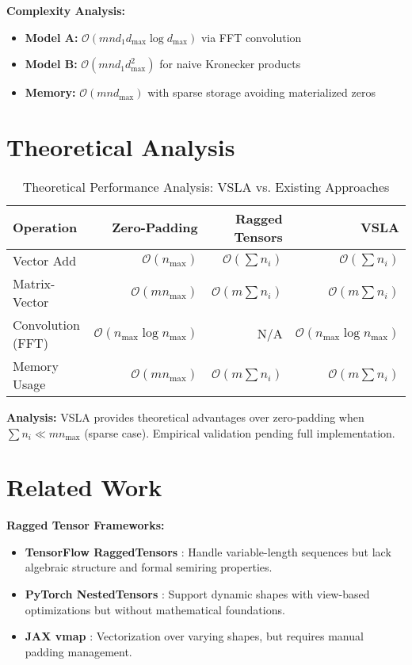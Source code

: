 \documentclass[11pt]{article}
\begin{document}
\textbf{Complexity Analysis:} 
\begin{itemize}[leftmargin=1.5em]
\item \textbf{Model A:} $\mathcal{O}(mn d_1 d_{\max} \log d_{\max})$ via FFT convolution
\item \textbf{Model B:} $\mathcal{O}(mn d_1 d_{\max}^2)$ for naive Kronecker products  
\item \textbf{Memory:} $\mathcal{O}(mn d_{\max})$ with sparse storage avoiding materialized zeros
\end{itemize}

\section{Theoretical Analysis}
\label{sec:evaluation}

\begin{table}[h]
\centering
\caption{Theoretical Performance Analysis: VSLA vs. Existing Approaches}
\begin{tabular}{lrrr}
\toprule
\textbf{Operation} & \textbf{Zero-Padding} & \textbf{Ragged Tensors} & \textbf{VSLA} \\
\midrule
Vector Add & $\mathcal{O}(n_{\max})$ & $\mathcal{O}(\sum n_i)$ & $\mathcal{O}(\sum n_i)$ \\
Matrix-Vector & $\mathcal{O}(mn_{\max})$ & $\mathcal{O}(m\sum n_i)$ & $\mathcal{O}(m\sum n_i)$ \\
Convolution (FFT) & $\mathcal{O}(n_{\max} \log n_{\max})$ & N/A & $\mathcal{O}(n_{\max} \log n_{\max})$ \\
Memory Usage & $\mathcal{O}(mn_{\max})$ & $\mathcal{O}(m\sum n_i)$ & $\mathcal{O}(m\sum n_i)$ \\
\bottomrule
\end{tabular}
\end{table}

\textbf{Analysis:} VSLA provides theoretical advantages over zero-padding when $\sum n_i \ll mn_{\max}$ (sparse case). Empirical validation pending full implementation.

\section{Related Work}  
\label{sec:related}

\textbf{Ragged Tensor Frameworks:}
\begin{itemize}[leftmargin=1.5em]
\item \textbf{TensorFlow RaggedTensors} \cite{TF2019}: Handle variable-length sequences but lack algebraic structure and formal semiring properties.
\item \textbf{PyTorch NestedTensors} \cite{PyTorch2021}: Support dynamic shapes with view-based optimizations but without mathematical foundations.
\item \textbf{JAX vmap} \cite{JAX2020}: Vectorization over varying shapes, but requires manual padding management.
\end{itemize}
\end{document}
